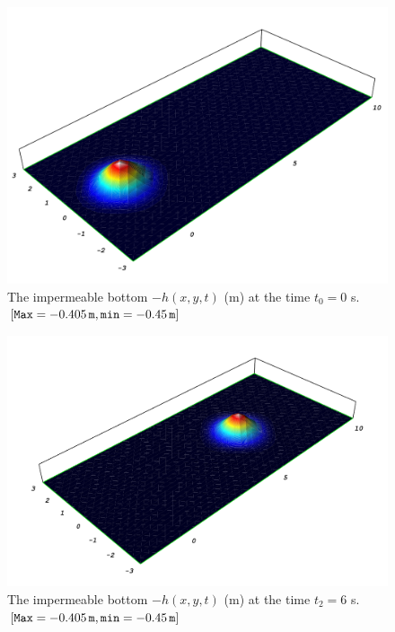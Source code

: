 \begin{figure}
  \begin{center}
    \includegraphics[width=\largefig]{chapters/lopes/pdf/depth0.pdf}
  \end{center}
  \caption{The impermeable bottom $-h(x,y,t)$ (m) at the time $t_0=0$
    s. $[{\tt Max}= -0.405\, {\tt m}, {\tt min}=-0.45\,{\tt m}]$}
  \label{fig:lopes:objectbottom}
\end{figure}

\begin{figure}
  \begin{center}
    \includegraphics[width=\largefig]{chapters/lopes/pdf/depth6.pdf}
  \end{center}
  \caption{The impermeable bottom $-h(x,y,t)$ (m) at the time $t_2=6$
    s. $[{\tt Max}= -0.405\, {\tt m}, {\tt min}=-0.45\,{\tt m}]$}
  \label{fig:lopes:objectbottom2}
\end{figure}

